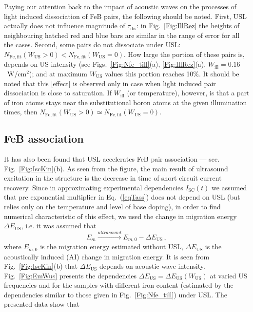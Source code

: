 \documentclass[%
 aip,jap,
 amsmath,amssymb,
 reprint,%
]{revtex4-1}
\begin{document}
Paying our attention back to the impact of acoustic waves on the processes of light induced dissociation of FeB pairs, the following should be noted. 
First,  USL actually does not influence magnitude of $\tau_\mathrm{dis}$: 
in Fig.~\ref{Fig:IllRez} the heights of neighbouring hatched red and blue bars are similar in the range of error for all the cases.
Second, some pairs do not dissociate under USL: 
$N_\mathrm{Fe,fit}(W_\mathrm{US}>0)< N_\mathrm{Fe,fit}(W_\mathrm{US}=0)$. 
How large the portion of these pairs is, depends on US intensity  
(see Figs.~\ref{Fig:Nfe_till}(a), \ref{Fig:IllRez}(a), $W_\mathrm{ill}=0.16$~W/cm$^2$); 
and at maximum $W_\mathrm{US}$ values this portion reaches 10\%. 
It should be noted that this [effect] is observed only in case when light induced pair dissociation is close to saturation. 
If $W_\mathrm{ill}$ (or temperature), however, is that a part of iron atoms stays near the substitutional boron atoms at the given illumination times, 
then $N_\mathrm{Fe,fit}(W_\mathrm{US}>0)\simeq N_\mathrm{Fe,fit}(W_\mathrm{US}=0)$.


\subsection{\label{sec:FeBass}FeB association}

It has also been found that USL accelerates FeB pair association --– 
see. Fig.~\ref{Fig:IscKin}(b). 
As seen from the figure, the main result of ultrasound excitation in the structure 
is the decrease in time of short circuit current recovery. 
Since in approximating experimental dependencies $I_\mathrm{SC}(t)$ we assumed that pre exponential multiplier in Eq.~(\ref{eqTass}) does not depend on USL 
(but relies only on the temperature and level of base doping), 
in order to find numerical characteristic of this effect, 
we used the change in migration energy $\Delta E_\mathrm{US}$, i.e. it was assumed that
\begin{equation}
\label{eqEmUs}
E_m \xrightarrow{ultrasound} E_{m,0}-\Delta E_\mathrm{US}\,,
\end{equation}
where $E_{m,0}$ is the migration energy estimated without USL, 
$\Delta E_\mathrm{US}$ is the acoustically induced (AI) change in migration energy. 
It is seen from Fig.~\ref{Fig:IscKin}(b) 
that $\Delta E_\mathrm{US}$ depends on acoustic wave intensity. 
Fig.~\ref{Fig:EmWus} presents the dependencies $\Delta E_\mathrm{US}=\Delta E_\mathrm{US}(W_\mathrm{US})$ at varied US frequencies and for the samples with different iron content 
(estimated by the dependencies similar to those given in Fig.~\ref{Fig:Nfe_till}) under USL. 
The presented data show that
\end{document}
